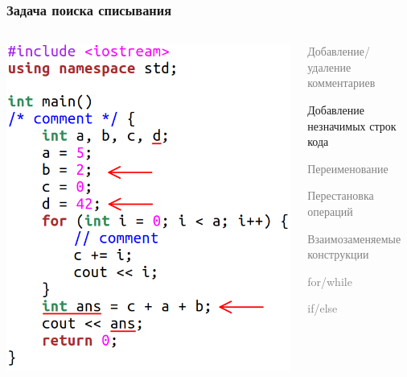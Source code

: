 \documentclass[10pt]{beamer}
\begin{document}
\begin{frame}[fragile]\frametitle{Задача поиска списывания}
	\begin{columns}[T]
		\centering
		\includegraphics[scale=0.7]{insert.png}
		
		\centering
		\begin{itemize}
			\item \textcolor{gray}{Добавление/удаление комментариев}
				\item Добавление незначимых строк кода
				\textcolor{gray}{
				\item Переименование
				\item Перестановка операций
				\item Взаимозаменяемые конструкции
			}
			\begin{itemize}
				\item \textcolor{gray}{for/while
					\item if/else
				}
			\end{itemize}
		\end{itemize}
	\end{columns}
\end{frame}
\end{document}
